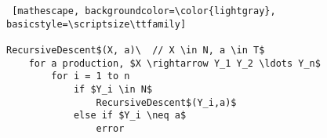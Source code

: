 \documentclass[
    border=0.2cm,
    convert={density=600}
]{standalone}
\begin{document}
\begin{lstlisting} [mathescape, backgroundcolor=\color{lightgray},
basicstyle=\scriptsize\ttfamily]

RecursiveDescent$(X, a)\  // X \in N, a \in T$
    for a production, $X \rightarrow Y_1 Y_2 \ldots Y_n$
        for i = 1 to n
            if $Y_i \in N$
                RecursiveDescent$(Y_i,a)$
            else if $Y_i \neq a$
                error
\end{lstlisting}
\end{document}
